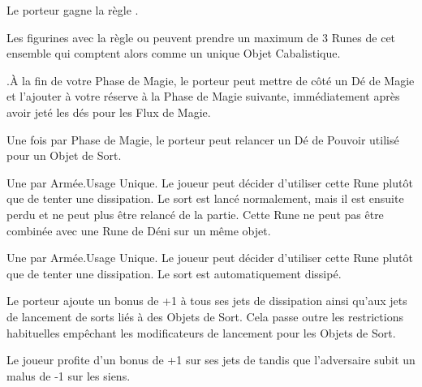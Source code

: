 \begin{multicols}{2}
Le porteur gagne la règle \fireborn{}.

\endpricelist

\subtitle{Runes Cabalistiques}\vspace{5pt}

Les figurines avec la règle \runecraft{} ou \runecraftmastery{} peuvent prendre un maximum de 3 Runes de cet ensemble qui comptent alors comme un unique Objet Cabalistique.

\begin{description}[leftmargin=0.3cm, labelindent=0cm, labelsep=0.1cm] %

\oneofakind{}.\newline À la fin de votre Phase de Magie, le porteur peut mettre de côté un Dé de Magie et l'ajouter à votre réserve à la Phase de Magie suivante, immédiatement après avoir jeté les dés pour les Flux de Magie.

Une fois par Phase de Magie, le porteur peut relancer un Dé de Pouvoir utilisé pour un Objet de Sort.

Une par Armée.\newline Usage Unique. Le joueur peut décider d'utiliser cette Rune plutôt que de tenter une dissipation. Le sort est lancé normalement, mais il est ensuite perdu et ne peut plus être relancé de la partie. Cette Rune ne peut pas être combinée avec une Rune de Déni sur un même objet.

Une par Armée.\newline Usage Unique. Le joueur peut décider d'utiliser cette Rune plutôt que de tenter une dissipation. Le sort est automatiquement dissipé.

 Le porteur ajoute un bonus de +1 à tous ses jets de dissipation ainsi qu'aux jets de lancement de sorts liés à des Objets de Sort. Cela passe outre les restrictions habituelles empêchant les modificateurs de lancement pour les Objets de Sort.

 Le joueur profite d'un bonus de +1 sur ses jets de \channel{} tandis que l'adversaire subit un malus de -1 sur les siens.

\end{description}

\subtitle{Bannières Runiques}\vspace{5pt}


\end{multicols}

